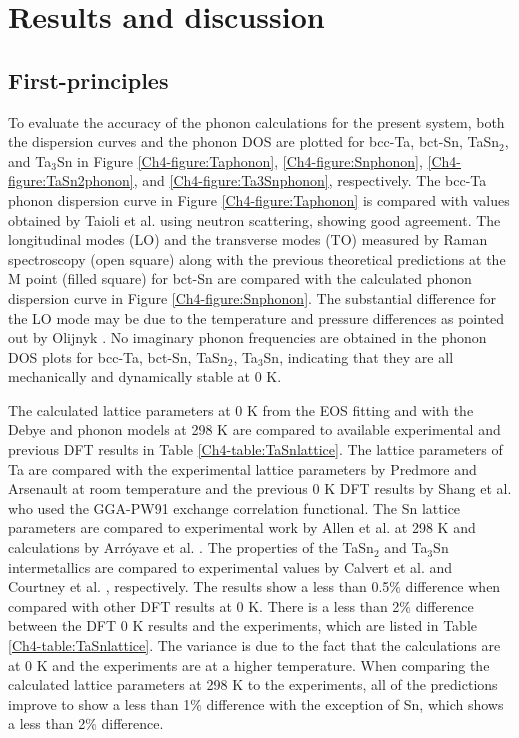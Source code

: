 \section{Results and discussion}

\subsection{First-principles}

To evaluate the accuracy of the phonon calculations for the present system, both the dispersion curves and the phonon DOS are plotted for bcc-Ta, bct-Sn, TaSn$_2$, and Ta$_3$Sn in Figure \ref{Ch4-figure:Taphonon}, \ref{Ch4-figure:Snphonon}, \ref{Ch4-figure:TaSn2phonon}, and \ref{Ch4-figure:Ta3Snphonon}, respectively.  The bcc-Ta phonon dispersion curve in  Figure \ref{Ch4-figure:Taphonon} is compared with values obtained by Taioli et al. \cite{Taioli2007a} using neutron scattering, showing good agreement. The longitudinal modes (LO) and the transverse modes (TO) measured by Raman spectroscopy \cite{Olijnyk1992} (open square) along with the previous theoretical predictions at the M point (filled square) for bct-Sn are compared with the calculated phonon dispersion curve in Figure \ref{Ch4-figure:Snphonon}. The substantial difference for the LO mode may be due to the temperature and pressure differences as pointed out by Olijnyk \cite{Olijnyk1992}. No imaginary phonon frequencies are obtained in the phonon DOS plots for bcc-Ta, bct-Sn, TaSn$_2$, Ta$_3$Sn, indicating that they are all mechanically and dynamically stable at 0 K. 

The calculated lattice parameters at 0 K from the EOS fitting and with the Debye and phonon models at 298 K are compared to available experimental and previous DFT results in Table \ref{Ch4-table:TaSnlattice}. The lattice parameters of Ta are compared with the experimental lattice parameters by Predmore and Arsenault \cite{Predmore1970} at room temperature and the previous 0 K DFT results by Shang et al. \cite{Shang2010b} who used the GGA-PW91 exchange correlation functional. The Sn lattice parameters are compared to experimental work by Allen et al. \cite{Allen1991} at 298 K and calculations by Arr\'oyave et al. \cite{Arroyave2006a}. The properties of the TaSn$_2$ and Ta$_3$Sn intermetallics are compared to experimental values by Calvert et al. \cite{Calvert1991} and Courtney et al. \cite{Courtney1965}, respectively. The results show a less than 0.5$\%$ difference when compared with other DFT results at 0 K. There is a less than 2$\%$ difference between the DFT 0 K results and the experiments, which are listed in Table \ref{Ch4-table:TaSnlattice}. The variance is due to the fact that the calculations are at 0 K and the experiments are at a higher temperature. When comparing the calculated lattice parameters at 298 K to the experiments, all of the predictions improve to show a less than 1$\%$ difference with the exception of Sn, which shows a less than 2$\%$ difference. 

